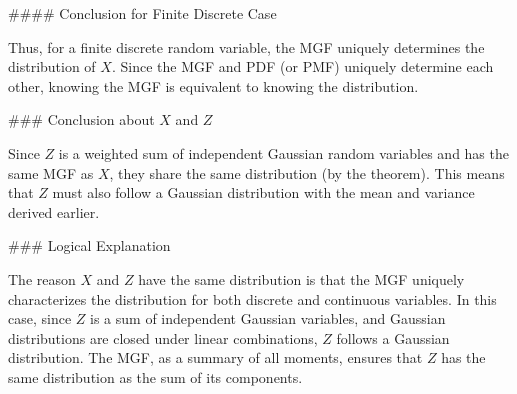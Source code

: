 \documentclass[a4paper,12pt,answers]{exam}
\begin{document}
\begin{questions}
\begin{solution}
#### Conclusion for Finite Discrete Case

Thus, for a finite discrete random variable, the MGF uniquely determines the distribution of \( X \). Since the MGF and PDF (or PMF) uniquely determine each other, knowing the MGF is equivalent to knowing the distribution.

### Conclusion about \( X \) and \( Z \)

Since \( Z \) is a weighted sum of independent Gaussian random variables and has the same MGF as \( X \), they share the same distribution (by the theorem). This means that \( Z \) must also follow a Gaussian distribution with the mean and variance derived earlier. 

### Logical Explanation

The reason \( X \) and \( Z \) have the same distribution is that the MGF uniquely characterizes the distribution for both discrete and continuous variables. In this case, since \( Z \) is a sum of independent Gaussian variables, and Gaussian distributions are closed under linear combinations, \( Z \) follows a Gaussian distribution. The MGF, as a summary of all moments, ensures that \( Z \) has the same distribution as the sum of its components.
\end{solution}


\end{questions}
\end{document}

